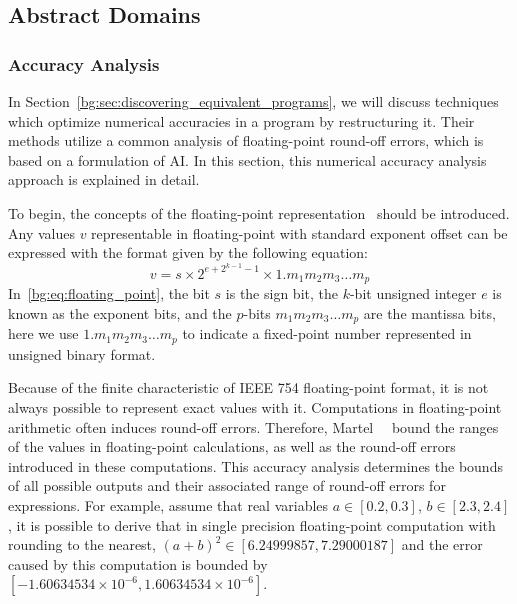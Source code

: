 \subsection{Abstract Domains}
\label{bg:sub:abstract_domains}


\subsubsection{Accuracy Analysis}
\label{bg:ssub:accuracy}

In Section~\ref{bg:sec:discovering_equivalent_programs}, we will discuss
techniques which optimize numerical accuracies in a program by restructuring
it.  Their methods utilize a common analysis of floating-point round-off
errors, which is based on a formulation of AI\@.  In this section, this
numerical accuracy analysis approach is explained in detail.

To begin, the concepts of the floating-point representation~\cite{ieee754}
should be introduced. Any values $v$ representable in floating-point with
standard exponent offset can be expressed with the format given by the
following equation:
\begin{equation}
    v = s \times 2^{e + 2^{k - 1} - 1} \times 1.{m_1 m_2 m_3 \ldots m_p}
    \label{bg:eq:floating_point}
\end{equation}
In~\eqref{bg:eq:floating_point}, the bit $s$ is the sign bit, the $k$-bit
unsigned integer $e$ is known as the exponent bits, and the $p$-bits $m_1 m_2
m_3 \ldots m_p$ are the mantissa bits, here we use $1.{m_1 m_2 m_3 \ldots m_p}$
to indicate a fixed-point number represented in unsigned binary format.

Because of the finite characteristic of IEEE 754 floating-point format,
it is not always possible to represent exact values with it. Computations
in floating-point arithmetic often induces round-off errors. Therefore,
Martel~\etal~\cite{martel07} bound the ranges of the values in floating-point
calculations, as well as the round-off errors introduced in these computations.
This accuracy analysis determines the bounds of all possible outputs and
their associated range of round-off errors for expressions.  For example,
assume that real variables $a \in [0.2, 0.3]$, $b \in [2.3, 2.4]$, it is
possible to derive that in single precision floating-point computation with
rounding to the nearest, ${(a + b)}^2 \in [6.24999857, 7.29000187]$ and the
error caused by this computation is bounded by $[-1.60634534\times10^{-6},
1.60634534\times10^{-6}]$.

